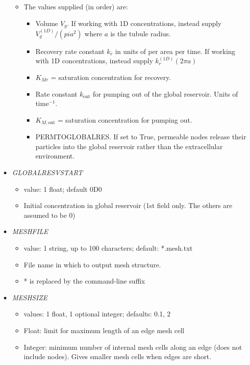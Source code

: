 \documentclass[12pt]{article}
\begin{document}
\begin{itemize}
\begin{itemize}
	\item The values supplied (in order) are:
	\begin{itemize}
		\item Volume $V_g$. If working with 1D concentrations, instead supply $V_g^{(1D)}/(pi a^2)$ where $a$ is the tubule radius.
		\item Recovery rate constant $k_r$ in units of per area per time. If working with 1D concentrations, instead supply $k_r^{(1D)} (2\pi a)$
		\item $K_{Mr}$ = saturation concentration for recovery. 
		\item Rate constant $k_\text{out}$ for pumping out of the global reservoir. Units of time$^{-1}$.
		\item $K_{M,\text{out}}$ = saturation concentration for pumping out.
		\item PERMTOGLOBALRES. If set to True, permeable nodes release their particles into the global reservoir rather than the extracellular environment.
	\end{itemize}
\end{itemize}
%
\item {\it GLOBALRESVSTART}
\begin{itemize}
	\item  value: 1 float; default 0D0
	\item Initial concentration in global reservoir (1st field only. The others are assumed to be 0)
\end{itemize}
%
\item {\it MESHFILE}
\begin{itemize}
	\item  value: 1 string, up to 100 characters; default: *.mesh.txt
	\item File name in which to output mesh structure.
	\item * is replaced by the command-line suffix
\end{itemize}
%
\item {\it MESHSIZE}
\begin{itemize}
	\item  values: 1 float, 1 optional integer; defaults: 0.1, 2
	\item Float: limit for maximum length of an edge mesh cell
	\item Integer: minimum number of internal mesh cells along an edge (does not include nodes). Gives smaller mesh cells when edges are short.

\end{itemize}
\end{itemize}
\end{document}
